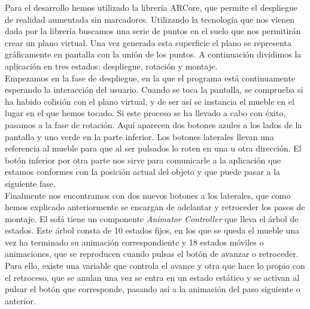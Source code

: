 Para el desarrollo hemos utilizado la librería ARCore, que permite el despliegue de realidad aumentada sin marcadores. Utilizando la tecnología que nos vienen dada por la librería buscamos una serie de puntos en el suelo que nos permitirán crear un plano virtual. Una vez generada esta superficie el plano se representa gráficamente en pantalla con la unión de los puntos. A continuación dividimos la aplicación en tres estados: despliegue, rotación y montaje.\\ 

Empezamos en la fase de despliegue, en la que el programa está continuamente esperando la interacción del usuario. Cuando se toca la pantalla, se comprueba si ha habido colisión con el plano virtual, y de ser así se instancia el mueble en el lugar en el que hemos tocado. Si este proceso se ha llevado a cabo con éxito, pasamos a la fase de rotación. Aquí aparecen dos botones azules a los lados de la pantalla y uno verde en la parte inferior. Los botones laterales llevan una referencia al mueble para que al ser pulsados lo roten en una u otra dirección. El botón inferior por otra parte nos sirve para comunicarle a la aplicación que estamos conformes con la posición actual del objeto y que puede pasar a la siguiente fase.\\ 

Finalmente nos encontramos con dos nuevos botones a los laterales, que como hemos explicado anteriormente se encargan de adelantar y retroceder los pasos de montaje. El sofá tiene un componente \textit{Animator Controller} que lleva el árbol de estados. Este árbol consta de 10 estados fijos, en los que se queda el mueble una vez ha terminado su animación correspondiente y 18 estados móviles o animaciones, que se reproducen cuando pulsas el botón de avanzar o retroceder. Para ello, existe una variable que controla el avance y otra que hace lo propio con el retroceso, que se anulan una vez se entra en un estado estático y se activan al pulsar el botón que corresponde, pasando así a la animación del paso siguiente o anterior.\\

